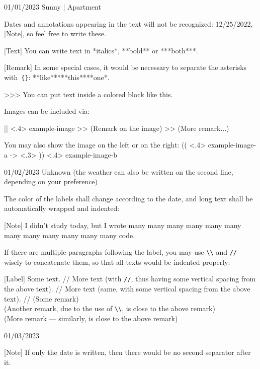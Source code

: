 \documentclass[11pt, paperstyle=light yellow, color entry, month-day-year]{jwjournal}
\begin{document}
01/01/2023 Sunny | Apartment

  Dates and annotations appearing in the text will not be recognized: 12/25/2022, [Note], so feel free to write these.

  [Text] You can write text in *italics*, **bold** or ***both***.

  [Remark] In some special cases, it would be necessary to separate the asterisks with~\texttt{\{\}}: **like**{}***this***{}*one*.

  >>> You can put text inside a colored block like this.

  Images can be included via:

  || <.4> {example-image} %
  >> (Remark on the image)
  >> (More remark...)

  You may also show the image on the left or on the right:
  (( <.4> {example-image-a} %
  -> <.3> %
  )) <.4> {example-image-b} %



01/02/2023
Unknown (the weather can also be written on the second line, depending on your preference)

  The color of the labels shall change according to the date, and long text shall be automatically wrapped and indented:

  [Note] I didn't study today, but I wrote many many many many many many many many many many many many code.

  If there are multiple paragraphs following the label, you may use \texttt{\textbackslash\textbackslash} and \texttt{\slash\slash} wisely to concatenate them, so that all texts would be indented properly:

  [Label] Some text.
    //
    More text (with \texttt{\slash\slash}, thus having some vertical spacing from the above text).
    //
    More text (same, with some vertical spacing from the above text).
    //
    (Some remark)
    \\
    (Another remark, due to the use of \texttt{\textbackslash\textbackslash}, is close to the above remark)
    \\
    (More remark --- similarly, is close to the above remark)



01/03/2023

  [Note] If only the date is written, then there would be no second separator after it.
\end{document}
